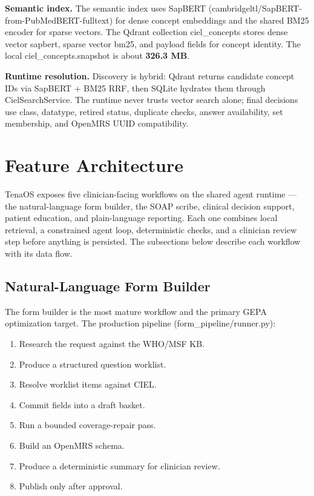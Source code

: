 \documentclass[11pt]{article}
\newcommand{\OpenMRS}{OpenMRS}
\newcommand{\CIEL}{CIEL}
\newcommand{\WHO}{WHO/MSF}
\newcommand{\code}[1]{{\setlength{\fboxsep}{1.7pt}\colorbox{codebg}{\textcolor{codeink}{\small\ttfamily #1}}}}
\begin{document}
\textbf{Semantic index.} The semantic index uses SapBERT (\code{cambridgeltl/SapBERT-from-PubMedBERT-fulltext}) for dense concept embeddings and the shared BM25 encoder for sparse vectors. The Qdrant collection \code{ciel\_concepts} stores dense vector \code{sapbert}, sparse vector \code{bm25}, and payload fields for concept identity. The local \code{ciel\_concepts.snapshot} is about \textbf{326.3 MB}.

\textbf{Runtime resolution.} Discovery is hybrid: Qdrant returns candidate concept IDs via SapBERT + BM25 RRF, then SQLite hydrates them through \code{CielSearchService}. The runtime never trusts vector search alone; final decisions use class, datatype, retired status, duplicate checks, answer availability, set membership, and \OpenMRS{} UUID compatibility.

\section{Feature Architecture}

TenaOS exposes five clinician-facing workflows on the shared agent runtime --- the natural-language form builder, the SOAP scribe, clinical decision support, patient education, and plain-language reporting. Each one combines local retrieval, a constrained agent loop, deterministic checks, and a clinician review step before anything is persisted. The subsections below describe each workflow with its data flow.

\subsection{Natural-Language Form Builder}

The form builder is the most mature workflow and the primary GEPA optimization target. The production pipeline (\code{form\_pipeline/runner.py}):

\begin{enumerate}
  \item Research the request against the \WHO{} KB.
  \item Produce a structured question worklist.
  \item Resolve worklist items against \CIEL{}.
  \item Commit fields into a draft basket.
  \item Run a bounded coverage-repair pass.
  \item Build an \OpenMRS{} schema.
  \item Produce a deterministic summary for clinician review.
  \item Publish only after approval.
\end{enumerate}
\end{document}
